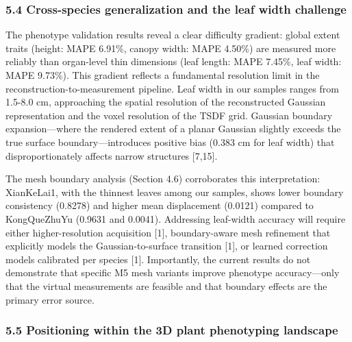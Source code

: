 \documentclass[11pt,a4paper]{article}
\begin{document}
\subsubsection{5.4 Cross-species generalization and the leaf width
challenge}\label{cross-species-generalization-and-the-leaf-width-challenge}

The phenotype validation results reveal a clear difficulty gradient:
global extent traits (height: MAPE 6.91\%, canopy width: MAPE 4.50\%)
are measured more reliably than organ-level thin dimensions (leaf
length: MAPE 7.45\%, leaf width: MAPE 9.73\%). This gradient reflects a
fundamental resolution limit in the reconstruction-to-measurement
pipeline. Leaf width in our samples ranges from 1.5-8.0 cm, approaching
the spatial resolution of the reconstructed Gaussian representation and
the voxel resolution of the TSDF grid. Gaussian boundary
expansion---where the rendered extent of a planar Gaussian slightly
exceeds the true surface boundary---introduces positive bias (0.383 cm
for leaf width) that disproportionately affects narrow structures
{[}7,15{]}.

The mesh boundary analysis (Section 4.6) corroborates this
interpretation: XianKeLai1, with the thinnest leaves among our samples,
shows lower boundary consistency (0.8278) and higher mean displacement
(0.0121) compared to KongQueZhuYu (0.9631 and 0.0041). Addressing
leaf-width accuracy will require either higher-resolution acquisition
{[}1{]}, boundary-aware mesh refinement that explicitly models the
Gaussian-to-surface transition {[}1{]}, or learned correction models
calibrated per species {[}1{]}. Importantly, the current results do not
demonstrate that specific M5 mesh variants improve phenotype
accuracy---only that the virtual measurements are feasible and that
boundary effects are the primary error source.

\subsubsection{5.5 Positioning within the 3D plant phenotyping
landscape}\label{positioning-within-the-3d-plant-phenotyping-landscape}
\end{document}
